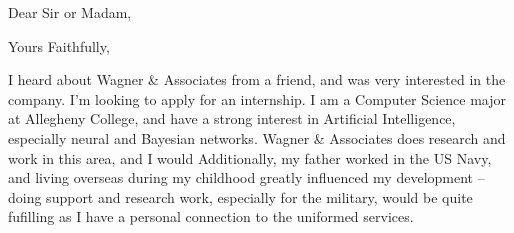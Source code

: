 \documentclass[11pt,a4paper,sans]{moderncv}        %
\begin{document}
\date{March 30, 2017}
\opening{Dear Sir or Madam,}
\closing{Yours Faithfully,}
\makelettertitle

I heard about Wagner \& Associates from a friend, and was very interested in the company. I'm looking to apply for an internship. I am a Computer Science major at Allegheny College, and have a strong interest in Artificial Intelligence, especially neural and Bayesian networks. Wagner \& Associates does research and work in this area, and I would Additionally, my father worked in the US Navy, and living overseas during my childhood greatly influenced my development -- doing support and research work, especially for the military, would be quite fufilling as I have a personal connection to the uniformed services.

\makeletterclosing
\end{document}
